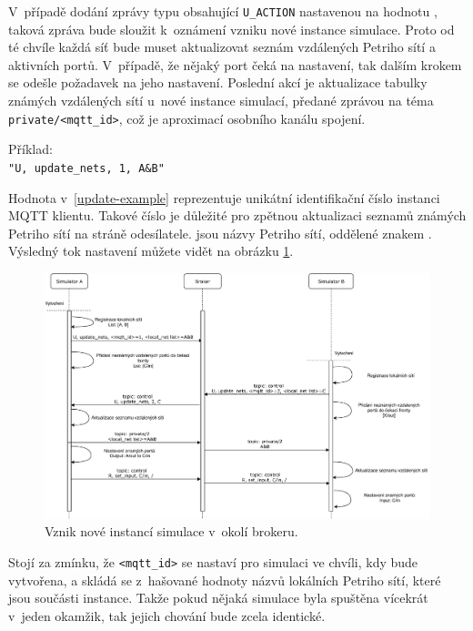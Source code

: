V~případě dodání zprávy typu  obsahující \texttt{U\_ACTION} nastavenou na hodnotu , taková zpráva bude sloužit k~oznámení vzniku nové instance simulace. Proto od té chvíle každá síť bude muset aktualizovat seznám vzdálených Petriho sítí a aktivních portů. V~případě, že nějaký port čeká na nastavení, tak dalším krokem se odešle požadavek na jeho nastavení. Poslední akcí je aktualizace tabulky známých vzdálených sítí u~nové instance simulací, předané zprávou na téma \texttt{private/<mqtt\_id>}, což je aproximací osobního kanálu spojení.

\begin{tabbing}
  \label{update-example}
  Příklad: \= \\
  \>\texttt{"U, update\_nets, 1, A\&B"}
\end{tabbing}

Hodnota  v~\ref{update-example} reprezentuje unikátní identifikační číslo instanci MQTT klientu. Takové číslo je důležité pro zpětnou aktualizaci seznamů známých Petriho sítí na stráně odesílatele.  jsou názvy Petriho sítí, oddělené znakem \uv{\texttt{\&}}. Výsledný tok nastavení můžete vidět na obrázku \ref{sim-register-viz}.

\begin{figure}[hbt]
  \centering
  \includegraphics[width=1\textwidth]{obrazky-figures/sim-register.pdf}
  \caption{Vznik nové instancí simulace v~okolí brokeru.}
  \label{sim-register-viz}
\end{figure}

Stojí za zmínku, že \texttt{<mqtt\_id>} se nastaví pro simulaci ve chvíli, kdy bude vytvořena, a skládá se z~hašované hodnoty názvů lokálních Petriho sítí, které jsou součásti instance. Takže pokud nějaká simulace byla spuštěna vícekrát v~jeden okamžik, tak jejich chování bude zcela identické.

